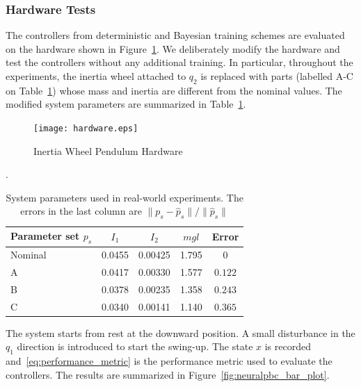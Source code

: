 \subsubsection{Hardware Tests} 

The controllers from deterministic and Bayesian training schemes are
evaluated on the hardware shown in Figure~\ref{fig:iwp_hardware}. 
%
We deliberately modify the hardware and test the controllers without any
additional training.
%
In particular, throughout the experiments, the inertia wheel attached to $q_2$
is replaced with parts (labelled A-C on Table~\ref{tab:modified_params}) whose
mass and inertia are different from the nominal values.
%
The modified system parameters are summarized in
Table~\ref{tab:modified_params}.
%
\begin{figure}[tb]
    \centering
    \texttt{[image: hardware.eps]}
    \caption{Inertia Wheel Pendulum Hardware}
    \label{fig:iwp_hardware}
\end{figure}
%

\begin{table}[tb]
    \centering
    \small
    \caption{System parameters used in real-world experiments. The errors in the
    last column are $\|p_s - \hat{p}_s\| / \|\hat{p}_s\|$}.
    \begin{tabular}{lcccc}
    \toprule
    Parameter set $p_s$ & $I_1$ & $I_2$ & $mgl$ & Error \\
    \midrule
    Nominal & 0.0455 & 0.00425 & 1.795 & 0 \\
    A & 0.0417 & 0.00330 & 1.577 & $0.122$ \\
    B & 0.0378 & 0.00235 & 1.358 & $0.243$ \\
    C & 0.0340 & 0.00141 & 1.140 & $0.365$ \\
    \bottomrule
    \end{tabular}
    \label{tab:modified_params}
\end{table}
%
The system starts from rest at the downward position. 
%
A small disturbance in the $q_1$ direction is introduced to start the swing-up.
%
The state $x$ is recorded and~\eqref{eq:performance_metric} is the
performance metric used to evaluate the controllers. The results are
summarized in Figure~\ref{fig:neuralpbc_bar_plot}.
%

